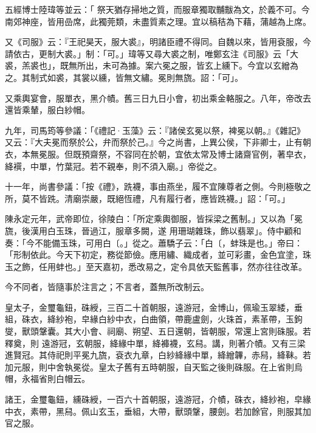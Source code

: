 \begin{pinyinscope}
 五經博士陸瑋等並云：「
 祭天猶存掃地之質，而服章獨取黼黻為文，於義不可。今南郊神座，皆用嵒席，此獨莞類，未盡質素之理。宜以稿秸為下藉，蒲越為上席。



 又《司服》云：『王祀昊天，服大裘』，明諸臣禮不得同。自魏以來，皆用袞服，今請依古，更制大裘。」制：「可。」瑋等又尋大裘之制，唯鄭玄注《司服》云「大裘，羔裘也」，既無所出，未可為據。案六冕之服，皆玄上纁下。今宜以玄繒為之。其制式如裘，其裳以纁，皆無文繡。冕則無旒。詔：「可」。



 又乘輿宴會，服單衣，黑介幘。舊三日九日小會，初出乘金輅服之。八年，帝改去還皆乘輦，服白紗帽。



 九年，司馬筠等參議：「《禮記·玉藻》云：『諸侯玄冕以祭，裨冕以朝。』《雜記》又云：『大夫冕而祭於公，弁而祭於己。』今之尚書，上異公侯，下非卿士，止有朝衣，本無冕服。但既預齋祭，不容同在於朝，宜依太常及博士諸齋官例，著皁衣，絳襈，中單，竹葉冠。若不親奉，則不須入廟。」帝從之。



 十一年，尚書參議：「按《禮》，跣襪，事由燕坐，履不宜陳尊者之側。今則極敬之所，莫不皆跣。清廟崇嚴，既絕恆禮，凡有履行者，應皆跣襪。」詔：「可。」



 陳永定元年，武帝即位，徐陵白：「所定乘輿御服，皆採梁之舊制。」又以為「冕旒，後漢用白玉珠，晉過江，服章多闕，遂
 用珊瑚雜珠，飾以翡翠」。侍中顧和奏：「今不能備玉珠，可用白〔。」從之。蕭驕子云：「白〔，蚌珠是也。」帝曰：「形制依此。今天下初定，務從節儉。應用繡、織成者，並可彩畫，金色宜塗，珠玉之飾，任用蚌也。」至天嘉初，悉改易之，定令具依天監舊事，然亦往往改革。



 今不同者，皆隨事於注言之；不言者，蓋無所改制云。



 皇太子，金璽龜鈕，硃綬，三百二十首朝服，遠游冠，金博山，佩瑜玉翠緌，垂組，硃衣，絳紗袍，皁緣白紗中衣，白曲領，帶鹿盧劍，火珠首，素革帶，玉鉤燮，獸頭鞶囊。其大小會、祠廟、朔望、五日還朝，皆朝服，常還上宮則硃服。若釋奠，則
 遠游冠，玄朝服，絳緣中單，絳褲襪，玄舄。講，則著介幘。又有三梁進賢冠。其侍祀則平冕九旒，袞衣九章，白紗絳緣中單，絳繒韠，赤舄，絳靺。若加元服，則中舍執冕從。皇太子舊有五時朝服，自天監之後則硃服。在上省則烏帽，永福省則白帽云。



 諸王，金璽龜鈕，纁硃綬，一百六十首朝服，遠游冠，介幘，硃衣，絳紗袍，皁緣中衣，素帶，黑舄。佩山玄玉，垂組，大帶，獸頭鞶，腰劍。若加餘官，則服其加官之服。




\end{pinyinscope}
